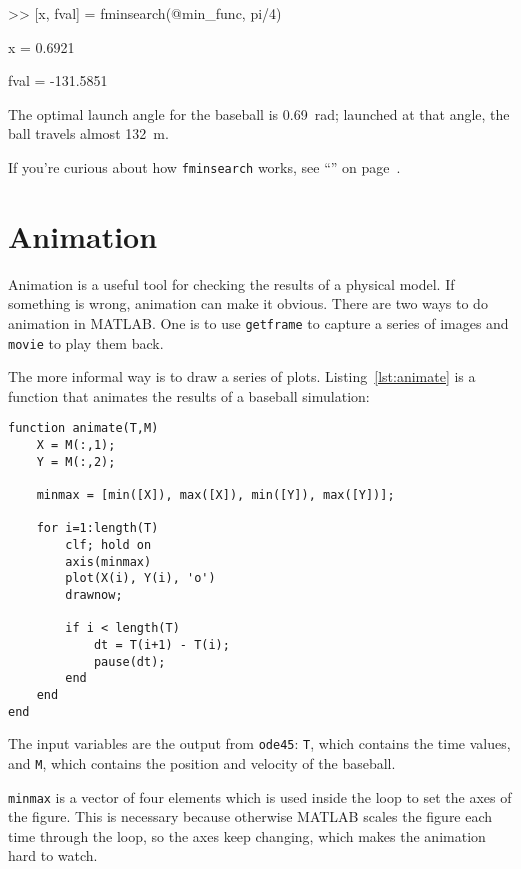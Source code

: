 \begin{code}
>> [x, fval] = fminsearch(@min_func, pi/4)

x = 0.6921

fval = -131.5851
\end{code}

The optimal launch angle for the baseball is \SI{0.69}{\radian}; launched at that angle, the ball travels almost \SI{132}{\meter}.

If you're curious about how {\tt fminsearch} works, see ``'' on page~\pageref{howfminsearch}.


\section{Animation}

Animation is a useful tool for checking the results of a physical model.  
If something is wrong, animation can make it obvious.
There are two ways to do animation in MATLAB.  
One is to use {\tt getframe} to capture a series of images and {\tt movie} to play them back.


The more informal way is to draw a series of plots.  Listing~\ref{lst:animate} is a function that animates the results of a baseball simulation:

\begin{lstlisting}[caption={A function that animates the results of a baseball simulation}, label={lst:animate}]
function animate(T,M)
    X = M(:,1);
    Y = M(:,2);

    minmax = [min([X]), max([X]), min([Y]), max([Y])];

    for i=1:length(T)
        clf; hold on
        axis(minmax)
        plot(X(i), Y(i), 'o')
        drawnow;
        
        if i < length(T)
            dt = T(i+1) - T(i);
            pause(dt);
        end
    end
end
\end{lstlisting}

The input variables are the output from {\tt ode45}: {\tt T}, which contains the time values, and {\tt M}, which contains the position and velocity of the baseball.


{\tt minmax} is a vector of four elements which is used inside the loop to set the axes of the figure.  
This is necessary because otherwise MATLAB scales the figure each time through the loop,
so the axes keep changing, which makes the animation hard to watch.

